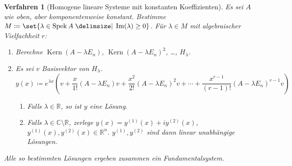 \documentclass[a4paper]{article}
\theoremstyle{marginbreak}
\newtheorem{verfahren}[definition]{Verfahren}
\DeclareMathOperator{\Spek}{Spek}
\DeclareMathOperator{\Kern}{Kern}
\begin{document}
	\begin{verfahren}[Homogene lineare Systeme mit konstanten Koeffizienten]
		Es sei $A$ wie oben, aber komponentenweise konstant.
		Bestimme $M\coloneqq\set{\lambda\in\Spek A\given \Im(\lambda)\geq 0}$.
		Für $\lambda\in M$ mit algebraischer Vielfachheit $r$:
		\begin{enumerate}
			\item Berechne $\Kern(A-\lambda E_n)$, $\Kern (A-\lambda E_n)^2$, \ldots, $H_\lambda$.
			\item Es sei $v$ Basisvektor von $H_\lambda$.
				\begin{equation*}
					y(x)\coloneqq e^{\lambda x}(v + \frac{x}{1!}(A-\lambda E_n)v + \frac{x^2}{2!}(A-\lambda E_n)^2v
						+\cdots+\frac{x^{r - 1}}{(r - 1)!}(A-\lambda E_n)^{r-1}v)
				\end{equation*}
				\begin{enumerate}[label=(\alph*)]
					\item Falls $\lambda\in\mathbb{R}$, so ist $y$ eine Lösung.
					\item Falls $\lambda\in\mathbb{C}\setminus\mathbb{R}$,
						zerlege $y(x)=y^{(1)}(x) + iy^{(2)}(x)$, $y^{(1)}(x), y^{(2)}(x)\in\mathbb{R}^n$.
						$y^{(1)}, y^{(2)}$ sind dann linear unabhängige Lösungen.
				\end{enumerate}
		\end{enumerate}
		Alle so bestimmten Lösungen ergeben zusammen ein Fundamentalsystem.
	\end{verfahren}
\end{document}
